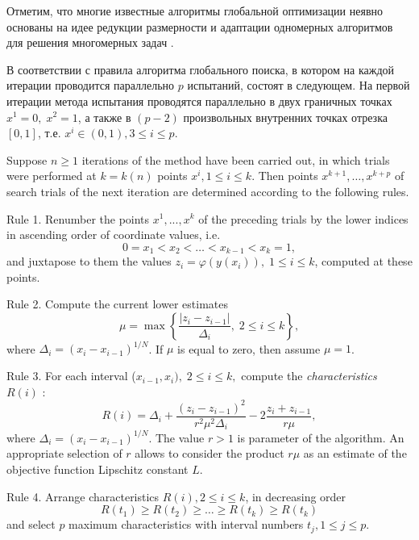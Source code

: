 \documentclass{svproc}
\begin{document}
Отметим, что многие известные алгоритмы глобальной оптимизации неявно основаны на идее редукции размерности и адаптации одномерных алгоритмов для решения многомерных задач \cite{Sergeyev2006,Zilinskas2008,Evtushenko2013}.


В соответствии с \cite{Strongin2000,Strongin2018} правила алгоритма глобального поиска, в котором на каждой итерации проводится параллельно $p$ испытаний, состоят в следующем.
На первой итерации метода испытания проводятся параллельно в двух граничных точках $x^1 = 0, \; x^2 = 1$, а также в $(p-2)$ произвольных внутренних точках отрезка $[0,1]$, т.е. $x^i\in(0,1),3\leq i \leq p$.

Suppose $n\geq 1$  iterations of the method have been carried out, in which trials were performed at $k=k(n)$ points $x^i,1\leq i \leq k$. Then points $x^{k+1},\dots,x^{k+p}$  of search trials of the next iteration are determined according to the following rules.

Rule 1. Renumber the points $x^1,...,x^k$ of the preceding trials by the
lower indices in ascending order of coordinate values, i.e.
\[
0=x_1<x_2<\dots <x_{k-1} <x_k=1,
\]
and juxtapose to them the values $z_i=\varphi(y(x_i)), \; 1 \leq i \leq k$, computed at these points.

Rule 2. Compute the current lower estimates
\begin{equation}\label{Rule_Mu}
\mu = \max\left\{ \frac{\left|z_i-z_{i-1}\right|}{ \Delta_i },\; 2 \leq i \leq k  \right\},
\end{equation}
where $\Delta_i = (x_i-x_{i-1})^{1/N}$. If $\mu$ is equal to zero, then assume $\mu = 1$.

Rule 3. For each interval ($x_{i-1},x_i), \; 2 \leq i \leq k,$ compute
the \textit{characteristics} $R(i)$ :
\begin{equation}\label{Rule_R}
R(i)=\Delta_i+\frac{(z_i-z_{i-1})^2}{r^2 \mu^2\Delta_i}-2\frac{z_i+z_{i-1}}{r \mu},
\end{equation}
where $\Delta_i=(x_i-x_{i-1})^{1/N}$. The value $r > 1$ is parameter of the algorithm. An appropriate selection
of $r$ allows to consider the product $r \mu$ as an estimate
of the objective function Lipschitz constant $L$.

Rule 4. Arrange characteristics  $R(i), 2 \leq i \leq k$, in decreasing order 
\begin{equation}\label{Rule_Max}
R(t_1)\geq R(t_2)\geq \dots \geq R(t_{k}) \geq R(t_{k})
\end{equation}
and select $p$ maximum characteristics with interval numbers $t_j, 1\leq j \leq p$.
\end{document}
